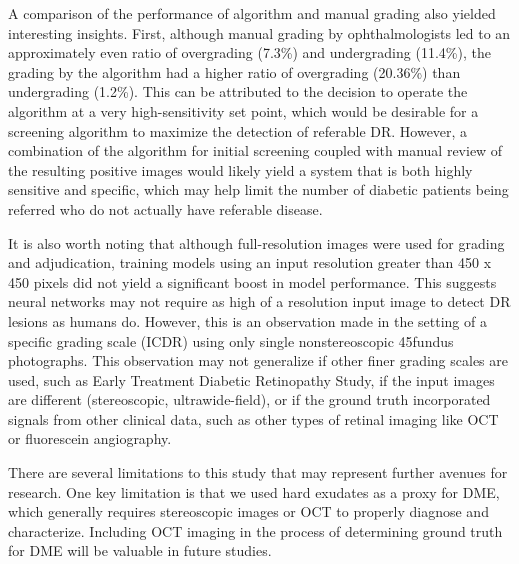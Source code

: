 \documentclass{llncs}
\begin{document}
A comparison of the performance of algorithm and manual grading also yielded interesting insights. First, although manual grading by ophthalmologists led to an approximately even ratio of overgrading (7.3\%) and undergrading (11.4\%), the grading by the algorithm had a higher ratio of overgrading (20.36\%) than undergrading (1.2\%). This can be attributed to the decision to operate the algorithm at a very high-sensitivity set point, which would be desirable for a screening algorithm to maximize the detection of referable DR. However, a combination of the algorithm for initial screening coupled with manual review of the resulting positive images would likely yield a system that is both highly sensitive and specific, which may help limit the number of diabetic patients being referred who do not actually have referable disease.

It is also worth noting that although full-resolution images were used for grading and adjudication, training models using an input resolution greater than 450 x 450 pixels did not yield a significant boost in model performance.  This suggests neural networks may not require as high of a resolution input image to detect DR lesions as humans do. However, this is an observation made in the setting of a specific grading scale (ICDR) using only single nonstereoscopic 45\textdegree\color fundus photographs. This observation may not generalize if other finer grading scales are used, such as Early Treatment Diabetic Retinopathy Study, if the input images are different (stereoscopic, ultrawide-field), or if the ground truth incorporated signals from other clinical data, such as other types of retinal imaging like OCT or fluorescein angiography.

There are several limitations to this study that may represent further avenues for research. One key limitation is that we used hard exudates as a proxy for DME, which generally requires stereoscopic images or OCT to properly diagnose and characterize. Including OCT imaging in the process of determining ground truth for DME will be valuable in future studies.
\end{document}
